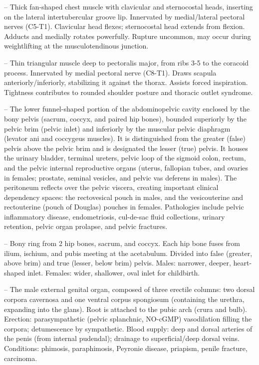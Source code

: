 -- Thick fan-shaped chest muscle with clavicular and sternocostal heads, inserting on the lateral intertubercular groove lip. Innervated by medial/lateral pectoral nerves (C5-T1). Clavicular head flexes; sternocostal head extends from flexion. Adducts and medially rotates powerfully. Rupture uncommon, may occur during weightlifting at the musculotendinous junction.

-- Thin triangular muscle deep to pectoralis major, from ribs 3-5 to the coracoid process. Innervated by medial pectoral nerve (C8-T1). Draws scapula anteriorly/inferiorly, stabilizing it against the thorax. Assists forced inspiration. Tightness contributes to rounded shoulder posture and thoracic outlet syndrome.

-- The lower funnel-shaped portion of the abdominopelvic cavity enclosed by the bony pelvis (sacrum, coccyx, and paired hip bones), bounded superiorly by the pelvic brim (pelvic inlet) and inferiorly by the muscular pelvic diaphragm (levator ani and coccygeus muscles). It is distinguished from the greater (false) pelvis above the pelvic brim and is designated the lesser (true) pelvis. It houses the urinary bladder, terminal ureters, pelvic loop of the sigmoid colon, rectum, and the pelvic internal reproductive organs (uterus, fallopian tubes, and ovaries in females; prostate, seminal vesicles, and pelvic vas deferens in males). The peritoneum reflects over the pelvic viscera, creating important clinical dependency spaces: the rectovesical pouch in males, and the vesicouterine and rectouterine (pouch of Douglas) pouches in females. Pathologies include pelvic inflammatory disease, endometriosis, cul-de-sac fluid collections, urinary retention, pelvic organ prolapse, and pelvic fractures.

-- Bony ring from 2 hip bones, sacrum, and coccyx. Each hip bone fuses from ilium, ischium, and pubis meeting at the acetabulum. Divided into false (greater, above brim) and true (lesser, below brim) pelvis. Males: narrower, deeper, heart-shaped inlet. Females: wider, shallower, oval inlet for childbirth.

-- The male external genital organ, composed of three erectile columns: two dorsal corpora cavernosa and one ventral corpus spongiosum (containing the urethra, expanding into the glans). Root is attached to the pubic arch (crura and bulb). Erection: parasympathetic (pelvic splanchnic, NO-cGMP) vasodilation filling the corpora; detumescence by sympathetic. Blood supply: deep and dorsal arteries of the penis (from internal pudendal); drainage to superficial/deep dorsal veins. Conditions: phimosis, paraphimosis, Peyronie disease, priapism, penile fracture, carcinoma.

